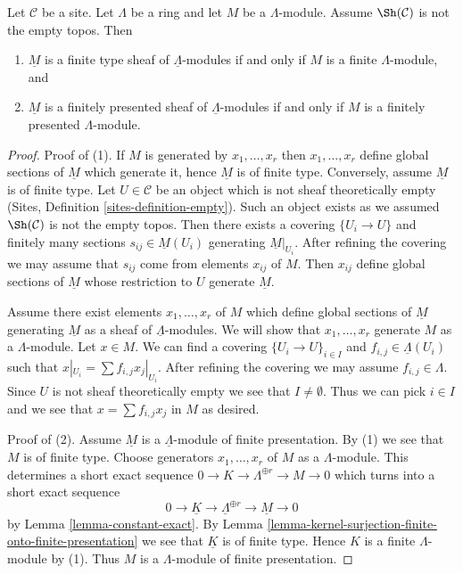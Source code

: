 \begin{lemma}
\label{lemma-locally-constant-finite-type}
Let $\mathcal{C}$ be a site. Let $\Lambda$ be a ring and let $M$ be a
$\Lambda$-module. Assume $\Sh(\mathcal{C})$ is not the empty topos. Then
\begin{enumerate}
\item $\underline{M}$ is a finite type sheaf of $\underline{\Lambda}$-modules
if and only if $M$ is a finite $\Lambda$-module, and
\item $\underline{M}$ is a finitely presented sheaf of
$\underline{\Lambda}$-modules if and only if $M$ is a 
finitely presented $\Lambda$-module.
\end{enumerate}
\end{lemma}

\begin{proof}
Proof of (1). If $M$ is generated by $x_1, \ldots, x_r$ then
$x_1, \ldots, x_r$ define global sections of $\underline{M}$ which
generate it, hence $\underline{M}$ is of finite type. Conversely, assume
$\underline{M}$ is of finite type. Let $U \in \mathcal{C}$ be an object
which is not sheaf theoretically empty
(Sites, Definition \ref{sites-definition-empty}).
Such an object exists as we assumed $\Sh(\mathcal{C})$ is not
the empty topos. Then there exists a covering $\{U_i \to U\}$
and finitely many sections $s_{ij} \in \underline{M}(U_i)$ generating
$\underline{M}|_{U_i}$. After refining the covering we may assume
that $s_{ij}$ come from elements $x_{ij}$ of $M$. Then
$x_{ij}$ define global sections of $\underline{M}$ whose restriction
to $U$ generate $\underline{M}$.

\medskip\noindent
Assume there exist elements $x_1, \ldots, x_r$ of $M$ which define
global sections of $\underline{M}$ generating $\underline{M}$
as a sheaf of $\underline{\Lambda}$-modules. We will show that
$x_1, \ldots, x_r$ generate $M$ as a $\Lambda$-module.
Let $x \in M$. We can find a covering $\{U_i \to U\}_{i \in I}$
and $f_{i, j} \in \underline{\Lambda}(U_i)$ such that
$x|_{U_i} = \sum f_{i, j} x_j|_{U_i}$. After refining the covering
we may assume $f_{i, j} \in \Lambda$. Since $U$ is not
sheaf theoretically empty we see that $I \not = \emptyset$.
Thus we can pick $i \in I$ and we see that $x = \sum f_{i, j}x_j$
in $M$ as desired.

\medskip\noindent
Proof of (2). Assume $\underline{M}$ is a $\underline{\Lambda}$-module
of finite presentation. By (1) we see that $M$ is of finite type.
Choose generators $x_1, \ldots, x_r$ of $M$ as a $\Lambda$-module.
This determines a short exact sequence
$0 \to K \to \Lambda^{\oplus r} \to M \to 0$ which
turns into a short exact sequence
$$
0 \to \underline{K} \to \underline{\Lambda}^{\oplus r} \to \underline{M} \to 0
$$
by Lemma \ref{lemma-constant-exact}. By
Lemma \ref{lemma-kernel-surjection-finite-onto-finite-presentation}
we see that $\underline{K}$ is of finite type. Hence $K$ is a
finite $\Lambda$-module by (1). Thus $M$ is a $\Lambda$-module
of finite presentation.
\end{proof}





